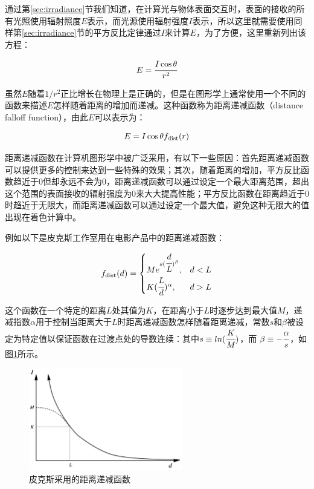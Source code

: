 通过第\ref{sec:irradiance}节我们知道，在计算光与物体表面交互时，表面的接收的所有光照使用辐射照度$E$表示，而光源使用辐射强度$I$表示，所以这里就需要使用同样第\ref{sec:irradiance}节的平方反比定律通过$I$来计算$E$，为了方便，这里重新列出该方程：

\begin{equation}
	E= \cfrac{I\cos\theta}{r^{2}}
\end{equation}

\noindent 虽然$E$随着$1/r^{2}$正比增长在物理上是正确的，但是在图形学上通常使用一个不同的函数来描述$E$怎样随着距离的增加而递减。这种函数称为距离递减函数（distance falloff function），由此$E$可以表示为：

\begin{equation}
	E=I\cos\theta f_{\rm dist}(r)
\end{equation}

距离递减函数在计算机图形学中被广泛采用，有以下一些原因：首先距离递减函数可以提供更多的控制来达到一些特殊的效果；其次，随着距离的增加，平方反比函数趋近于$0$但却永远不会为$0$，距离递减函数可以通过设定一个最大距离范围，超出这个范围的表面接收的辐射强度为0来大大提高性能；平方反比函数在距离趋近于$0$时趋近于无限大，而距离递减函数可以通过设定一个最大值，避免这种无限大的值出现在着色计算中。

例如以下是皮克斯工作室\cite{a:LightingControlsforComputerCinematography}用在电影产品中的距离递减函数：

\begin{equation}
	f_{\rm dist}(d)=\begin{cases}
		Me^{s( \cfrac{d}{L})^{\beta}}, & d<L\\
		K( \cfrac{L}{d})^{\alpha}, &d>L
	\end{cases}
\end{equation}

\noindent 这个函数在一个特定的距离$L$处其值为$K$，在距离小于$L$时逐步达到最大值$M$，递减指数$\alpha$用于控制当距离大于$L$时距离递减函数怎样随着距离递减，常数$s$和$\beta$被设定为特定值以保证函数在过渡点处的导数连续：其中$s\equiv ln( \cfrac{K}{M})$，而 $\beta\equiv - \cfrac{\alpha}{s}$，如图\ref{f:intro-falloff}所示。

\begin{figure}
\sidecaption
	\includegraphics[width=0.6\textwidth]{figures/intro/falloff}
	\caption{皮克斯采用的距离递减函数}
	\label{f:intro-falloff}
\end{figure}






